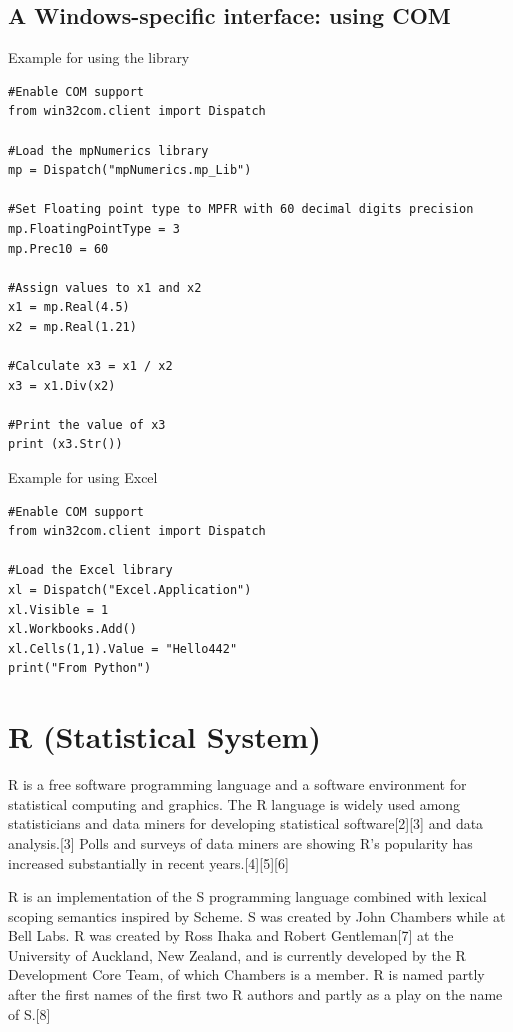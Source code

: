 \subsection{A Windows-specific interface: using COM}
\vpara
Example for using the library

\begin{lstlisting}
#Enable COM support
from win32com.client import Dispatch

#Load the mpNumerics library
mp = Dispatch("mpNumerics.mp_Lib")

#Set Floating point type to MPFR with 60 decimal digits precision
mp.FloatingPointType = 3
mp.Prec10 = 60

#Assign values to x1 and x2
x1 = mp.Real(4.5)
x2 = mp.Real(1.21)

#Calculate x3 = x1 / x2
x3 = x1.Div(x2)

#Print the value of x3
print (x3.Str())
\end{lstlisting}

\vpara
Example for using Excel

\begin{lstlisting}
#Enable COM support
from win32com.client import Dispatch

#Load the Excel library
xl = Dispatch("Excel.Application")
xl.Visible = 1
xl.Workbooks.Add() 
xl.Cells(1,1).Value = "Hello442" 
print("From Python")
\end{lstlisting}




\newpage
\section{R (Statistical System)}

R is a free software programming language and a software environment for statistical computing and graphics. The R language is widely used among statisticians and data miners for developing statistical software[2][3] and data analysis.[3] Polls and surveys of data miners are showing R's popularity has increased substantially in recent years.[4][5][6]

\vpara
R is an implementation of the S programming language combined with lexical scoping semantics inspired by Scheme. S was created by John Chambers while at Bell Labs. R was created by Ross Ihaka and Robert Gentleman[7] at the University of Auckland, New Zealand, and is currently developed by the R Development Core Team, of which Chambers is a member. R is named partly after the first names of the first two R authors and partly as a play on the name of S.[8]

